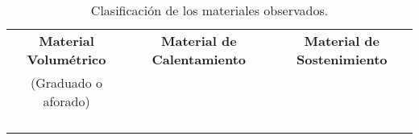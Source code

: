 \begin{table*}[p]
\centering
\begin{tabular}{|c|c|c|}
\hline
\bfseries Material Volumétrico & \bfseries Material de Calentamiento & \bfseries Material de Sostenimiento \\
(Graduado o aforado) & & \\
\hline
 & & \\
\hline
 & & \\
\hline
 & & \\
\hline
 & & \\
\hline
\end{tabular}
\caption{Clasificación de los materiales observados.}
\label{tab:clas-materiales}
\end{table*}
